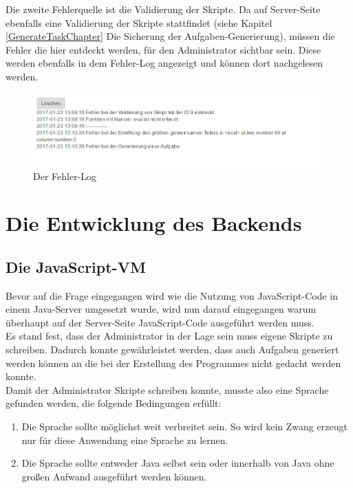 Die zweite Fehlerquelle ist die Validierung der Skripte. Da auf Server-Seite ebenfalls eine Validierung der Skripte stattfindet (siehe Kapitel \ref{GenerateTaskChapter} Die Sicherung der Aufgaben-Generierung), müssen die Fehler die hier entdeckt werden, für den Administrator sichtbar sein. Diese werden ebenfalls in dem Fehler-Log angezeigt und können dort nachgelesen werden.

\begin{figure}[htp]     %
\centering
\includegraphics[width=1\textwidth]{bilder/ErrorLog} 
\caption[Der Fehler-Log]{Der Fehler-Log}
\end{figure} 


\chapter{Die Entwicklung des Backends}

\section{Die JavaScript-VM}

Bevor auf die Frage eingegangen wird wie die Nutzung von JavaScript-Code in einem Java-Server umgesetzt wurde, wird nun darauf eingegangen warum überhaupt auf der Server-Seite JavaScript-Code ausgeführt werden muss. \\

Es stand fest, dass der Administrator in der Lage sein muss eigene Skripte zu schreiben. Dadurch konnte gewährleistet werden, dass auch Aufgaben generiert werden können an die bei der Erstellung des Programmes nicht gedacht werden konnte. \\
Damit der Administrator Skripte schreiben konnte, musste also eine Sprache gefunden werden, die folgende Bedingungen erfüllt:
\begin{enumerate}
\itemsep0em
\item Die Sprache sollte möglichst weit verbreitet sein. So wird kein Zwang erzeugt nur für diese Anwendung eine Sprache zu lernen.
\item Die Sprache sollte entweder Java selbst sein oder innerhalb von Java ohne großen Aufwand ausgeführt werden können.
\end{enumerate}

